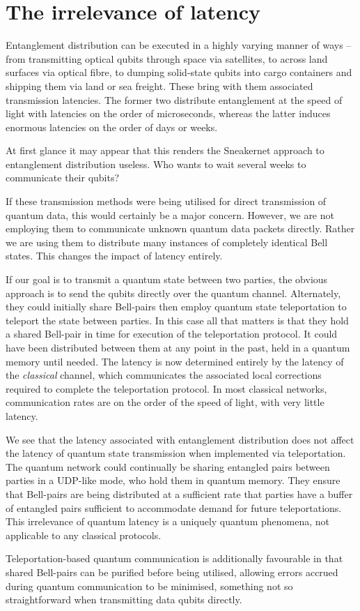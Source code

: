 %
%

\section{The irrelevance of latency}

Entanglement distribution can be executed in a highly varying manner of ways -- from transmitting optical qubits through space via satellites, to across land surfaces via optical fibre, to dumping solid-state qubits into cargo containers and shipping them via land or sea freight. These bring with them associated transmission latencies. The former two distribute entanglement at the speed of light with latencies on the order of microseconds, whereas the latter induces enormous latencies on the order of days or weeks.

At first glance it may appear that this renders the Sneakernet\texttrademark{} approach to entanglement distribution useless. Who wants to wait several weeks to communicate their qubits?

If these transmission methods were being utilised for direct transmission of quantum data, this would certainly be a major concern. However, we are not employing them to communicate unknown quantum data packets directly. Rather we are using them to distribute many instances of completely identical Bell states. This changes the impact of latency entirely.

If our goal is to transmit a quantum state between two parties, the obvious approach is to send the qubits directly over the quantum channel. Alternately, they could initially share Bell-pairs then employ quantum state teleportation to teleport the state between parties. In this case all that matters is that they hold a shared Bell-pair in time for execution of the teleportation protocol. It could have been distributed between them at any point in the past, held in a quantum memory until needed. The latency is now determined entirely by the latency of the \textit{classical} channel, which communicates the associated local corrections required to complete the teleportation protocol. In most classical networks, communication rates are on the order of the speed of light, with very little latency.

We see that the latency associated with entanglement distribution does not affect the latency of quantum state transmission when implemented via teleportation. The quantum network could continually be sharing entangled pairs between parties in a UDP-like mode, who hold them in quantum memory. They ensure that Bell-pairs are being distributed at a sufficient rate that parties have a buffer of entangled pairs sufficient to accommodate demand for future teleportations. This irrelevance of quantum latency is a uniquely quantum phenomena, not applicable to any classical protocols.

Teleportation-based quantum communication is additionally favourable in that shared Bell-pairs can be purified before being utilised, allowing errors accrued during quantum communication to be minimised, something not so straightforward when transmitting data qubits directly.
